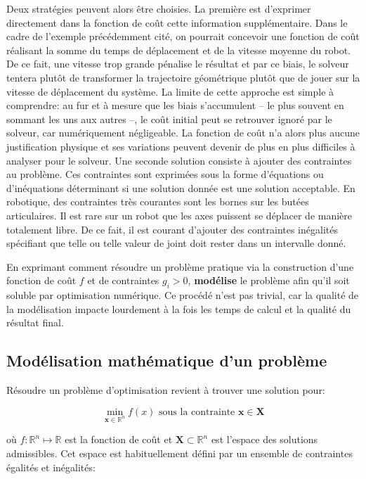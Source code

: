 Deux stratégies peuvent alors être choisies. La première est
d'exprimer directement dans la fonction de coût cette information
supplémentaire. Dans le cadre de l'exemple précédemment cité, on
pourrait concevoir une fonction de coût réalisant la somme du temps de
déplacement et de la vitesse moyenne du robot. De ce fait, une vitesse
trop grande pénalise le résultat et par ce biais, le solveur tentera
plutôt de transformer la trajectoire géométrique plutôt que de jouer
sur la vitesse de déplacement du système. La limite de cette approche
est simple à comprendre: au fur et à mesure que les biais s'accumulent
-- le plus souvent en sommant les uns aux autres --, le coût initial
peut se retrouver ignoré par le solveur, car numériquement
négligeable. La fonction de coût n'a alors plus aucune justification
physique et ses variations peuvent devenir de plus en plus difficiles
à analyser pour le solveur.  Une seconde solution consiste à ajouter
des contraintes au problème. Ces contraintes sont exprimées sous la
forme d'équations ou d'inéquations déterminant si une solution donnée
est une solution acceptable. En robotique, des contraintes très
courantes sont les bornes sur les butées articulaires. Il est rare sur
un robot que les axes puissent se déplacer de manière totalement
libre. De ce fait, il est courant d'ajouter des contraintes inégalités
spécifiant que telle ou telle valeur de joint doit rester dans un
intervalle donné.


En exprimant comment résoudre un problème pratique via la construction
d'une fonction de coût $f$ et de contraintes $g_i > 0$,
\textbf{modélise} le problème afin qu'il soit soluble par optimisation
numérique. Ce procédé n'est pas trivial, car la qualité de la
modélisation impacte lourdement à la fois les temps de calcul et la
qualité du résultat final.



\subsection{Modélisation mathématique d'un problème}\label{sec:chap1_optim_model}


Résoudre un problème d'optimisation revient à trouver une solution pour:

\begin{equation}
  \min_{\mathbf{x} \in \mathbb{R}^n} f(x) \text{ sous la contrainte } \mathbf{x} \in \mathbf{X}
\end{equation}

où $f : \mathbb{R}^n \mapsto \mathbb{R}$ est la fonction de coût et
$\mathbf{X} \subset \mathbb{R}^n$ est l'espace des solutions
admissibles. Cet espace est habituellement défini par un ensemble de
contraintes égalités et inégalités:

